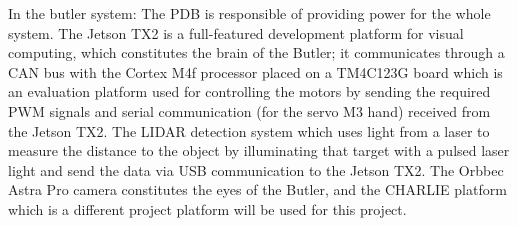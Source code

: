 In the butler system: The PDB is responsible of providing power for the whole system. The Jetson TX2  is a full-featured development platform for visual computing, which constitutes the brain of the Butler; it communicates through a CAN bus with the Cortex M4f processor placed on a TM4C123G board which is an evaluation platform used for controlling the motors by sending the required PWM signals and serial communication (for the servo M3 hand) received from the Jetson TX2.
The LIDAR\cite{lidar} detection system which uses light from a laser to measure the distance to the object by illuminating that target with a pulsed laser light and send the data via USB communication to the Jetson TX2.
The Orbbec Astra Pro camera\cite{Camera} constitutes the eyes of the Butler, and the CHARLIE platform which is a different project platform will be used for this project. 